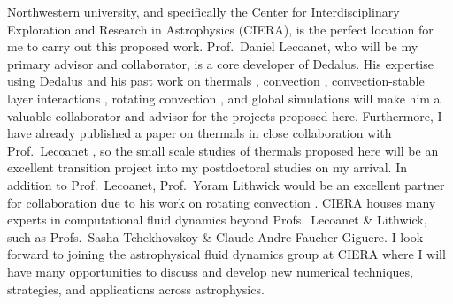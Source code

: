 \documentclass[11pt, preprint, hmargin=1in, vmargin=1in]{aastex62}
\begin{document}
Northwestern university, and specifically the Center for Interdisciplinary Exploration and Research in Astrophysics (CIERA), is the perfect location for me to carry out this proposed work.
Prof.~Daniel Lecoanet, who will be my primary advisor and collaborator, is a core developer of Dedalus.
His expertise using Dedalus and his past work on thermals \citep{lecoanet&jeevanjee2019, tarshish&all2018}, convection \citep{lecoanet&quataert2013, lecoanet&all2014}, convection-stable layer interactions \citep{lecoanet&all2016, couston&all2017}, rotating convection \citep{couston&all2019}, and global simulations \citep{lecoanet&all2019} will make him a valuable collaborator and advisor for the projects proposed here.
Furthermore, I have already published a paper on thermals in close collaboration with Prof.~Lecoanet \citep{andersLB2019}, so the small scale studies of thermals proposed here will be an excellent transition project into my postdoctoral studies on my arrival.
In addition to Prof.~Lecoanet, Prof.~Yoram Lithwick would be an excellent partner for collaboration due to his work on rotating convection \citep[e.g.,][]{BDLithwick2014}.
CIERA houses many experts in computational fluid dynamics beyond Profs.~Lecoanet \& Lithwick, such as Profs.~Sasha Tchekhovskoy \& Claude-Andre Faucher-Giguere.
I look forward to joining the astrophysical fluid dynamics group at CIERA where I will have many opportunities to discuss and develop new numerical techniques, strategies, and applications across astrophysics.




\end{document}
